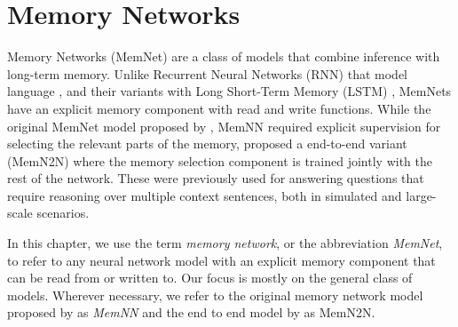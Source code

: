 \section{Memory Networks}
Memory Networks (MemNet) are a class of models
that combine inference with long-term memory. Unlike Recurrent Neural Networks
(RNN) that model language \citep{mikolov2010recurrent}, and their variants with
Long Short-Term Memory (LSTM) \citep{hochreiter1997long}, MemNets have an explicit
memory component with read and write functions. While the original MemNet model 
proposed by \cite{weston2014memory}, MemNN required explicit supervision
for selecting the relevant parts of the memory, \citep{sukhbaatar2015end}
proposed a end-to-end variant (MemN2N) where the memory selection component is
trained jointly with the rest of the network. These were previously used for
answering questions that require reasoning over multiple context sentences,
both in simulated \citep{bordes2010towards} and large-scale
\citep{fader2013paraphrase} scenarios.

In this chapter, we use the term \textit{memory network},
or the abbreviation \textit{MemNet}, to refer to any neural network model with an explicit memory component
that can be read from or written to. Our focus is mostly on the general class of models. Wherever necessary,
we refer to the original memory network model
proposed by \cite{weston2014memory} as \textit{MemNN} and the end to end model by \cite{sukhbaatar2015end}
as MemN2N.


